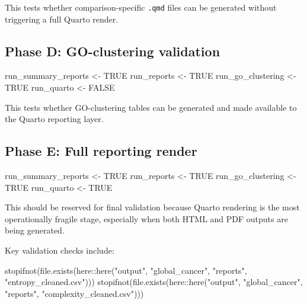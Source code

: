 \documentclass[
  letterpaper,
  DIV=11,
  numbers=noendperiod,
  openany,
  oneside]{scrreprt}
\newenvironment{Shaded}{\begin{snugshade}}{\end{snugshade}}
\newcommand{\ConstantTok}[1]{\textcolor[rgb]{0.56,0.35,0.01}{#1}}
\newcommand{\FunctionTok}[1]{\textcolor[rgb]{0.28,0.35,0.67}{#1}}
\newcommand{\NormalTok}[1]{\textcolor[rgb]{0.00,0.23,0.31}{#1}}
\newcommand{\OtherTok}[1]{\textcolor[rgb]{0.00,0.23,0.31}{#1}}
\newcommand{\SpecialCharTok}[1]{\textcolor[rgb]{0.37,0.37,0.37}{#1}}
\newcommand{\StringTok}[1]{\textcolor[rgb]{0.13,0.47,0.30}{#1}}
\begin{document}
This tests whether comparison-specific \texttt{.qmd} files can be
generated without triggering a full Quarto render.

\subsection*{Phase D: GO-clustering
validation}\label{phase-d-go-clustering-validation}

\begin{Shaded}
\begin{Highlighting}[]
\NormalTok{run\_summary\_reports }\OtherTok{\textless{}{-}} \ConstantTok{TRUE}
\NormalTok{run\_reports         }\OtherTok{\textless{}{-}} \ConstantTok{TRUE}
\NormalTok{run\_go\_clustering   }\OtherTok{\textless{}{-}} \ConstantTok{TRUE}
\NormalTok{run\_quarto          }\OtherTok{\textless{}{-}} \ConstantTok{FALSE}
\end{Highlighting}
\end{Shaded}

This tests whether GO-clustering tables can be generated and made
available to the Quarto reporting layer.

\subsection*{Phase E: Full reporting
render}\label{phase-e-full-reporting-render}

\begin{Shaded}
\begin{Highlighting}[]
\NormalTok{run\_summary\_reports }\OtherTok{\textless{}{-}} \ConstantTok{TRUE}
\NormalTok{run\_reports         }\OtherTok{\textless{}{-}} \ConstantTok{TRUE}
\NormalTok{run\_go\_clustering   }\OtherTok{\textless{}{-}} \ConstantTok{TRUE}
\NormalTok{run\_quarto          }\OtherTok{\textless{}{-}} \ConstantTok{TRUE}
\end{Highlighting}
\end{Shaded}

This should be reserved for final validation because Quarto rendering is
the most operationally fragile stage, especially when both HTML and PDF
outputs are being generated.

Key validation checks include:

\begin{Shaded}
\begin{Highlighting}[]
\FunctionTok{stopifnot}\NormalTok{(}\FunctionTok{file.exists}\NormalTok{(here}\SpecialCharTok{::}\FunctionTok{here}\NormalTok{(}\StringTok{"output"}\NormalTok{, }\StringTok{"global\_cancer"}\NormalTok{, }\StringTok{"reports"}\NormalTok{, }\StringTok{"entropy\_cleaned.csv"}\NormalTok{)))}
\FunctionTok{stopifnot}\NormalTok{(}\FunctionTok{file.exists}\NormalTok{(here}\SpecialCharTok{::}\FunctionTok{here}\NormalTok{(}\StringTok{"output"}\NormalTok{, }\StringTok{"global\_cancer"}\NormalTok{, }\StringTok{"reports"}\NormalTok{, }\StringTok{"complexity\_cleaned.csv"}\NormalTok{)))}
\end{Highlighting}
\end{Shaded}
\end{document}
